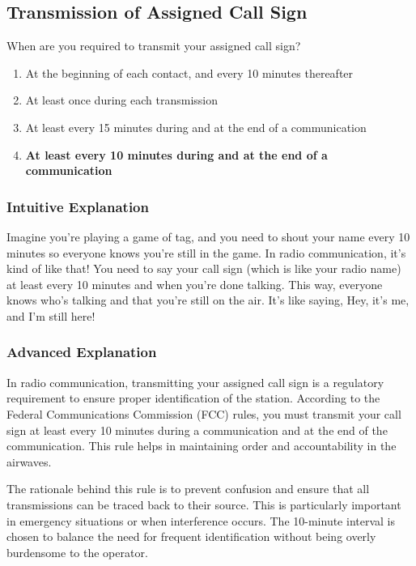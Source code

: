 \subsection{Transmission of Assigned Call Sign}\label{T1F03}

\begin{tcolorbox}[colback=gray!10!white,colframe=black!75!black,title=T1F03]
When are you required to transmit your assigned call sign?
\begin{enumerate}[label=\Alph*)]
    \item At the beginning of each contact, and every 10 minutes thereafter
    \item At least once during each transmission
    \item At least every 15 minutes during and at the end of a communication
    \item \textbf{At least every 10 minutes during and at the end of a communication}
\end{enumerate}
\end{tcolorbox}

\subsubsection{Intuitive Explanation}
Imagine you're playing a game of tag, and you need to shout your name every 10 minutes so everyone knows you're still in the game. In radio communication, it's kind of like that! You need to say your call sign (which is like your radio name) at least every 10 minutes and when you're done talking. This way, everyone knows who's talking and that you're still on the air. It's like saying, Hey, it's me, and I'm still here!

\subsubsection{Advanced Explanation}
In radio communication, transmitting your assigned call sign is a regulatory requirement to ensure proper identification of the station. According to the Federal Communications Commission (FCC) rules, you must transmit your call sign at least every 10 minutes during a communication and at the end of the communication. This rule helps in maintaining order and accountability in the airwaves.

The rationale behind this rule is to prevent confusion and ensure that all transmissions can be traced back to their source. This is particularly important in emergency situations or when interference occurs. The 10-minute interval is chosen to balance the need for frequent identification without being overly burdensome to the operator.

